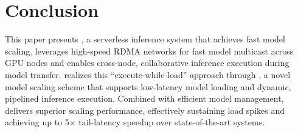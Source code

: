 \section{Conclusion}
\label{sec:conclusion}

This paper presents \SysName, a serverless inference system that achieves fast model scaling.
\SysName leverages high-speed RDMA networks for fast model multicast across GPU nodes and enables cross-node, collaborative inference execution during model transfer. 
\SysName realizes this ``execute-while-load'' approach through \AlgoName, a novel model scaling scheme that supports low-latency model loading and dynamic, pipelined inference execution. 
Combined with efficient model management, \SysName delivers superior scaling performance, effectively sustaining load spikes and achieving up to 5$\times$ tail-latency speedup over state-of-the-art systems. 
%
